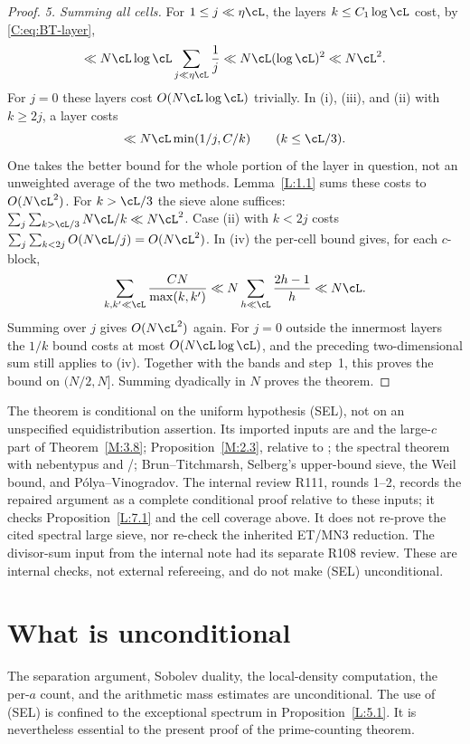 \begin{proof}
\smallskip\noindent
\emph{5. Summing all cells.}
For $1\leq j\ll\eta\cL$, the layers $k\leq C_1\log\cL$ cost,
by \eqref{C:eq:BT-layer},
\[
 \ll N\cL\log\cL\sum_{j\ll\eta\cL}\frac1j
 \ll N\cL(\log\cL)^2\ll N\cL^2.
\]
For $j=0$ these layers cost $O(N\cL\log\cL)$ trivially.
In (i), (iii), and (ii) with $k\geq2j$, a layer costs
\[
 \ll N\cL\min(1/j,C/k)\qquad(k\leq\cL/3).
\]
One takes the better bound for the whole portion of the layer in
question, not an unweighted average of the two methods.
Lemma~\ref{L:1.1} sums these costs to $O(N\cL^2)$.
For $k>\cL/3$ the sieve alone suffices:
$\sum_j\sum_{k>\cL/3}N\cL/k\ll N\cL^2$.
Case (ii) with $k<2j$ costs
$\sum_j\sum_{k<2j}O(N\cL/j)=O(N\cL^2)$.
In (iv) the per-cell bound gives, for each $c$-block,
\[
 \sum_{k,k'\ll\cL}\frac{CN}{\max(k,k')}
 \ll N\sum_{h\ll\cL}\frac{2h-1}{h}\ll N\cL.
\]
Summing over $j$ gives $O(N\cL^2)$ again.  For $j=0$ outside the
innermost layers the $1/k$ bound costs at most $O(N\cL\log\cL)$,
and the preceding two-dimensional sum still applies to (iv).
Together with the bands and step~1, this proves the bound on
$(N/2,N]$.  Summing dyadically in $N$ proves the theorem.
\end{proof}

\begin{remark}\label{C:rem:status}
The theorem is conditional on the uniform hypothesis (SEL), not on an
unspecified equidistribution assertion.  Its imported inputs are
\cite[Proposition~2.2, Lemma~2.8, (8.1)--(8.2)]{ET} and the large-$c$
part of Theorem~\ref{M:3.8}; Proposition~\ref{M:2.3}, relative to
\cite[Theorem~7.1]{ET}; the spectral theorem with nebentypus and
\cite[Theorem~2]{DI}/\cite[Proposition~4.7]{Dr}; Brun--Titchmarsh,
Selberg's upper-bound sieve, the Weil bound, and P\'olya--Vinogradov.
The internal review R111, rounds 1--2, records the repaired argument
as a complete conditional proof relative to these inputs; it checks
Proposition~\ref{L:7.1} and the cell coverage above.  It does not
re-prove the cited spectral large sieve, nor re-check the inherited
ET/MN3 reduction.  The divisor-sum input from the internal note had
its separate R108 review.  These are internal checks, not external
refereeing, and do not make (SEL) unconditional.
\end{remark}

\section{What is unconditional}\label{sec:uncond}
The separation argument, Sobolev duality, the local-density computation,
the per-$a$ count, and the arithmetic mass estimates are unconditional.
The use of (SEL) is confined to the exceptional spectrum in
Proposition~\ref{L:5.1}.  It is nevertheless essential to the present
proof of the prime-counting theorem.

